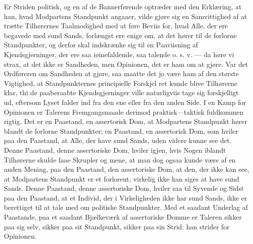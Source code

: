 \documentclass[12pt]{book}
\newcommand{\opage}[1]{\marginnote{\footnotesize\textit{[#1]}}}
\begin{document}
Er Striden politisk, og en af de Bannerførende optræder
med den Erklæring, at han, hvad Modpartens Standpunkt
angaaer, vilde gjøre sig en Samvittighed af at trætte
Tilhørernes Taalmodighed med at føre Beviis for, hvad
Alle, der ere begavede med sund Sands, forlængst ere enige
om, at det hører til de forlorne Standpunkter, og derfor
skal indskrænke sig til en Paaviisning af Kjendsgjerninger,
der ere saa iøinefaldende, saa talende o. s. v. --- da høre vi
strax, at det ikke er Sandheden, men Opinionen, det er ham
om at gjøre. Var det Ordføreren om Sandheden at gjøre,
saa maatte det jo være ham af den største Vigtighed, at
Standpunkternes principielle Forskjel ret kunde blive Tilhørerne
klar, thi de paaberaabte Kjendsgjerninger ville naturligviis
tage sig forskjelligt ud, eftersom Lyset falder ind fra den ene
eller fra den anden Side. I en Kamp for Opinionen er
Talerens Fremgangsmaade derimod praktisk---taktisk fuldkommen
rigtig. Det er en Paastand, en assertorisk Dom, at Modpartens
Standpunkt hører blandt de forlorne Standpunkter; en Paastand,
en assertorisk Dom, som hviler paa den Paastand, at Alle,
der have sund Sands, uden videre kunne see det. Denne Paastand,
denne assertoriske Dom, hviler igjen, hvis Nogen iblandt
Tilhørerne skulde faae Skrupler og mene, at man dog ogsaa
kunde være af en anden Mening, paa den Paastand, den
assertoriske Dom, at den, der ikke kan see, at Modpartens
Standpunkt er et forlorent, virkelig ikke kan siges at have
\opage{199}sund Sands. Denne Paastand, denne assertoriske Dom, hviler
saa til Syvende og Sidst paa den Paastand, at et Individ,
der i Virkeligheden ikke har sund Sands, ikke er berettiget
til at tale med om politiske Standpunkter. Med et saadant
Underlag af Paastande, paa et saadant Bjælkeværk af assertoriske
Domme er Taleren sikker paa sig selv, sikker paa sit
Standpunkt, sikker paa sin Strid: han strider for Opinionen.
\end{document}

